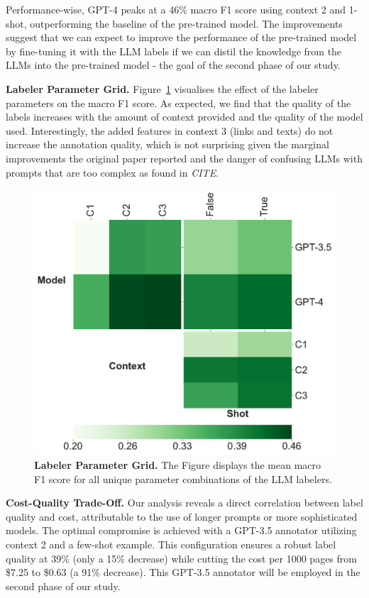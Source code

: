 

Performance-wise, GPT-4 peaks at a 46\% macro F1 score using context 2 and 1-shot, outperforming the baseline of the pre-trained model. The improvements suggest that we can expect to improve the performance of the pre-trained model by fine-tuning it with the LLM labels if we can distil the knowledge from the LLMs into the pre-trained model - the goal of the second phase of our study.

\textbf{Labeler Parameter Grid.} Figure~\ref{fig:labelers-grid} visualises the effect of the labeler parameters on the macro F1 score. As expected, we find that the quality of the labels increases with the amount of context provided and the quality of the model used. Interestingly, the added features in context 3 (links and texts) do not increase the annotation quality, which is not surprising given the marginal improvements the original paper reported and the danger of confusing LLMs with prompts that are too complex as found in \textit{CITE}.

\begin{figure}[!h]
    \centering
    \includegraphics[width=.8\columnwidth]{./figures/labelers-grid.pdf}
    \caption{\textbf{Labeler Parameter Grid.} The Figure displays the mean macro F1 score for all unique parameter combinations of the LLM labelers.}
    \label{fig:labelers-grid}
\end{figure}

\textbf{Cost-Quality Trade-Off.} Our analysis reveals a direct correlation between label quality and cost, attributable to the use of longer prompts or more sophisticated models. The optimal compromise is achieved with a GPT-3.5 annotator utilizing context 2 and a few-shot example. This configuration ensures a robust label quality at 39\% (only a 15\% decrease) while cutting the cost per 1000 pages from \$7.25 to \$0.63 (a 91\% decrease). This GPT-3.5 annotator will be employed in the second phase of our study.

